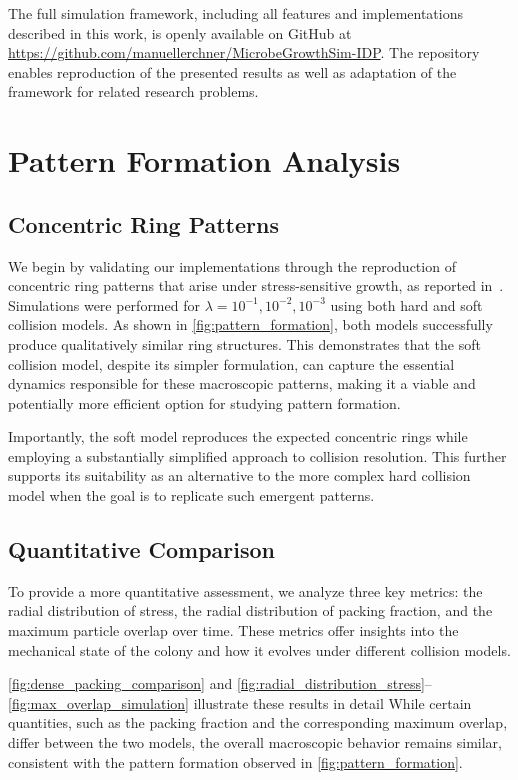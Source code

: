 \documentclass[conference]{IEEEtran}
\begin{document}
The full simulation framework, including all features and implementations described in this work, is openly available on GitHub at \url{https://github.com/manuellerchner/MicrobeGrowthSim-IDP}.
The repository enables reproduction of the presented results as well as adaptation of the framework for related research problems.

\section{Pattern Formation Analysis}

\subsection{Concentric Ring Patterns}

We begin by validating our implementations through the reproduction of concentric ring patterns that arise under stress-sensitive growth, as reported in~\cite{Weady2024}. Simulations were performed for $\lambda = 10^{-1}, 10^{-2}, 10^{-3}$ using both hard and soft collision models. As shown in \autoref{fig:pattern_formation}, both models successfully produce qualitatively similar ring structures. This demonstrates that the soft collision model, despite its simpler formulation, can capture the essential dynamics responsible for these macroscopic patterns, making it a viable and potentially more efficient option for studying pattern formation.

Importantly, the soft model reproduces the expected concentric rings while employing a substantially simplified approach to collision resolution. This further supports its suitability as an alternative to the more complex hard collision model when the goal is to replicate such emergent patterns.


\subsection{Quantitative Comparison}

To provide a more quantitative assessment, we analyze three key metrics: the radial distribution of stress, the radial distribution of packing fraction, and the maximum particle overlap over time. These metrics offer insights into the mechanical state of the colony and how it evolves under different collision models.

\autoref{fig:dense_packing_comparison} and \autoref{fig:radial_distribution_stress}--\autoref{fig:max_overlap_simulation} illustrate these results in detail While certain quantities, such as the packing fraction and the corresponding maximum overlap, differ between the two models, the overall macroscopic behavior remains similar, consistent with the pattern formation observed in \autoref{fig:pattern_formation}.
\end{document}
